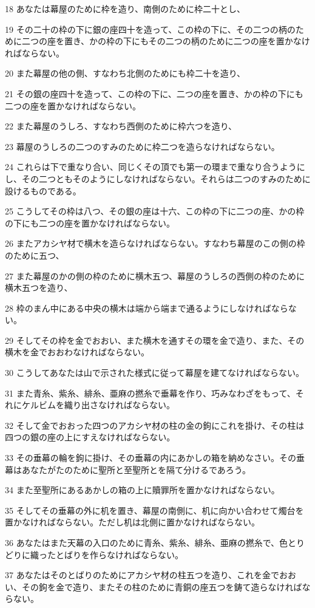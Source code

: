 \par 18 あなたは幕屋のために枠を造り、南側のために枠二十とし、
\par 19 その二十の枠の下に銀の座四十を造って、この枠の下に、その二つの柄のために二つの座を置き、かの枠の下にもその二つの柄のために二つの座を置かなければならない。
\par 20 また幕屋の他の側、すなわち北側のためにも枠二十を造り、
\par 21 その銀の座四十を造って、この枠の下に、二つの座を置き、かの枠の下にも二つの座を置かなければならない。
\par 22 また幕屋のうしろ、すなわち西側のために枠六つを造り、
\par 23 幕屋のうしろの二つのすみのために枠二つを造らなければならない。
\par 24 これらは下で重なり合い、同じくその頂でも第一の環まで重なり合うようにし、その二つともそのようにしなければならない。それらは二つのすみのために設けるものである。
\par 25 こうしてその枠は八つ、その銀の座は十六、この枠の下に二つの座、かの枠の下にも二つの座を置かなければならない。
\par 26 またアカシヤ材で横木を造らなければならない。すなわち幕屋のこの側の枠のために五つ、
\par 27 また幕屋のかの側の枠のために横木五つ、幕屋のうしろの西側の枠のために横木五つを造り、
\par 28 枠のまん中にある中央の横木は端から端まで通るようにしなければならない。
\par 29 そしてその枠を金でおおい、また横木を通すその環を金で造り、また、その横木を金でおおわなければならない。
\par 30 こうしてあなたは山で示された様式に従って幕屋を建てなければならない。
\par 31 また青糸、紫糸、緋糸、亜麻の撚糸で垂幕を作り、巧みなわざをもって、それにケルビムを織り出さなければならない。
\par 32 そして金でおおった四つのアカシヤ材の柱の金の鉤にこれを掛け、その柱は四つの銀の座の上にすえなければならない。
\par 33 その垂幕の輪を鉤に掛け、その垂幕の内にあかしの箱を納めなさい。その垂幕はあなたがたのために聖所と至聖所とを隔て分けるであろう。
\par 34 また至聖所にあるあかしの箱の上に贖罪所を置かなければならない。
\par 35 そしてその垂幕の外に机を置き、幕屋の南側に、机に向かい合わせて燭台を置かなければならない。ただし机は北側に置かなければならない。
\par 36 あなたはまた天幕の入口のために青糸、紫糸、緋糸、亜麻の撚糸で、色とりどりに織ったとばりを作らなければならない。
\par 37 あなたはそのとばりのためにアカシヤ材の柱五つを造り、これを金でおおい、その鉤を金で造り、またその柱のために青銅の座五つを鋳て造らなければならない。

